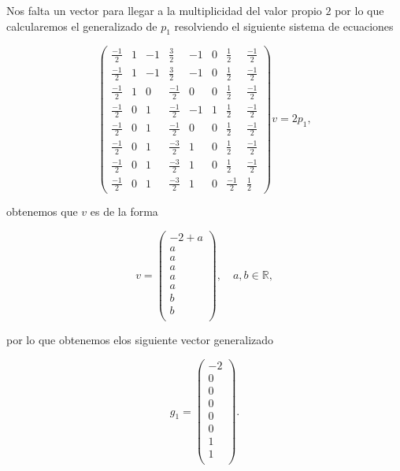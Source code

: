 \documentclass[letterpaper]{article}
\theoremstyle{definition}
\theoremstyle{lemathm}
\theoremstyle{lemademthm}
\newcommand{\pars}[1]{\left( #1 \right) }
\newcommand{\RR}{\mathbb{R}}
\newcommand{\1}{\mathbbm{1}}
\begin{document}
\begin{enumerate}
\begin{itemize}
			Nos falta un vector para llegar a la multiplicidad del valor propio $2$ por lo que calcularemos el generalizado de $p_1$ resolviendo el siguiente sistema de ecuaciones

			\[\pars{\begin{array}{cccccccc}
				\frac{-1}{2} & 1 & -1 & \frac{3}{2} & -1 & 0 & \frac{1}{2} & \frac{-1}{2} \\[1ex]
				\frac{-1}{2} & 1 & -1 & \frac{3}{2} & -1 & 0 & \frac{1}{2} & \frac{-1}{2} \\[1ex]
				\frac{-1}{2} & 1 & 0 & \frac{-1}{2} & 0 & 0 & \frac{1}{2} & \frac{-1}{2} \\[1ex]
				\frac{-1}{2} & 0 & 1 & \frac{-1}{2} & -1 & 1 & \frac{1}{2} & \frac{-1}{2} \\[1ex]
				\frac{-1}{2} & 0 & 1 & \frac{-1}{2} & 0 & 0 & \frac{1}{2} & \frac{-1}{2} \\[1ex]
				\frac{-1}{2} & 0 & 1 & \frac{-3}{2} & 1 & 0 & \frac{1}{2} & \frac{-1}{2} \\[1ex]
				\frac{-1}{2} & 0 & 1 & \frac{-3}{2} & 1 & 0 & \frac{1}{2} & \frac{-1}{2} \\
				\frac{-1}{2} & 0 & 1 & \frac{-3}{2} & 1 & 0 & \frac{-1}{2} & \frac{1}{2}
			 \end{array}} v = 2 p_1,\]

			obtenemos que $v$ es de la forma

			\[v = \pars{\begin{array}{c}
				-2+a\\[1ex]
				a\\[1ex]
				a\\[1ex]
				a\\[1ex]
				a\\[1ex]
				a\\[1ex]
				b\\[1ex]
				b\\
			\end{array}}, \quad a,b\in\RR,\]

			por lo que obtenemos elos siguiente vector generalizado

			\[g_1 = \pars{\begin{array}{c}
				-2\\[1ex]
				0\\[1ex]
				0\\[1ex]
				0\\[1ex]
				0\\[1ex]
				0\\[1ex]
				1\\[1ex]
				1\\
			\end{array}}.\]


\end{itemize}
\end{enumerate}
\end{document}
